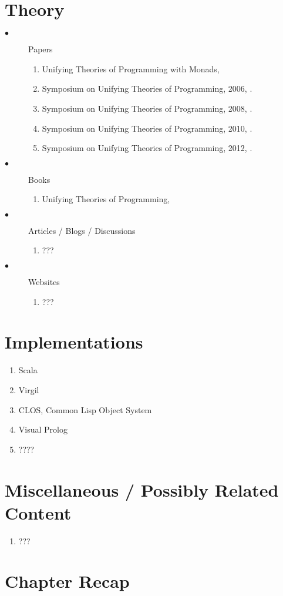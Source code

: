 \documentclass[thesis-solanki.tex]{subfiles}
\begin{document}
\section{Theory}
\begin{description}

\item[$\bullet$] Papers
\begin{enumerate}
\item Unifying Theories of Programming with Monads, \cite{gibbons2013unifying}

\item Symposium on Unifying Theories of Programming, 2006, \cite{DBLP:conf/utp/2006}.

\item Symposium on Unifying Theories of Programming, 2008, \cite{DBLP:conf/utp/2008}.

\item Symposium on Unifying Theories of Programming, 2010, \cite{DBLP:conf/utp/2010}.

\item Symposium on Unifying Theories of Programming, 2012, \cite{DBLP:conf/utp/2012}.

\end{enumerate}

\item[$\bullet$] Books
\begin{enumerate}
\item Unifying Theories of Programming, \cite{hoare1998unifying}
\end{enumerate}

\item[$\bullet$] Articles / Blogs / Discussions
\begin{enumerate}
\item ???
\end{enumerate}

\item[$\bullet$] Websites
\begin{enumerate}
\item ???
\end{enumerate}

\end{description}


\section{Implementations}
\begin{enumerate}
\item Scala
\item Virgil
\item CLOS, Common Lisp Object System
\item Visual Prolog
\item ????
\end{enumerate}

\section{Miscellaneous / Possibly Related Content}
\begin{enumerate}
\item ???
\end{enumerate}



\section{Chapter Recap}
\end{document}
